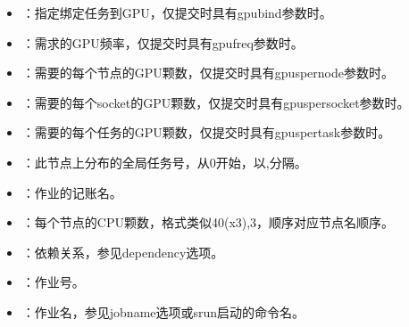 \documentclass[a4paper,12pt,english]{sphinxmanual}
\begin{document}
\begin{itemize}
\item {} 
\sphinxAtStartPar
{}：指定绑定任务到GPU，仅提交时具有\sphinxhyphen{}\sphinxhyphen{}gpu\sphinxhyphen{}bind参数时。

\item {} 
\sphinxAtStartPar
{}：需求的GPU频率，仅提交时具有\sphinxhyphen{}\sphinxhyphen{}gpu\sphinxhyphen{}freq参数时。

\item {} 
\sphinxAtStartPar
{}：需要的每个节点的GPU颗数，仅提交时具有\sphinxhyphen{}\sphinxhyphen{}gpus\sphinxhyphen{}per\sphinxhyphen{}node参数时。

\item {} 
\sphinxAtStartPar
{}：需要的每个socket的GPU颗数，仅提交时具有\sphinxhyphen{}\sphinxhyphen{}gpus\sphinxhyphen{}per\sphinxhyphen{}socket参数时。

\item {} 
\sphinxAtStartPar
{}：需要的每个任务的GPU颗数，仅提交时具有\sphinxhyphen{}\sphinxhyphen{}gpus\sphinxhyphen{}per\sphinxhyphen{}task参数时。

\item {} 
\sphinxAtStartPar
{}：此节点上分布的全局任务号，从0开始，以,分隔。

\item {} 
\sphinxAtStartPar
{}：作业的记账名。

\item {} 
\sphinxAtStartPar
{}：每个节点的CPU颗数，格式类似40(x3),3，顺序对应节点名顺序。

\item {} 
\sphinxAtStartPar
{}：依赖关系，参见\sphinxhyphen{}\sphinxhyphen{}dependency选项。

\item {} 
\sphinxAtStartPar
{}：作业号。

\item {} 
\sphinxAtStartPar
{}：作业名，参见\sphinxhyphen{}\sphinxhyphen{}job\sphinxhyphen{}name选项或srun启动的命令名。


\end{itemize}
\end{document}
